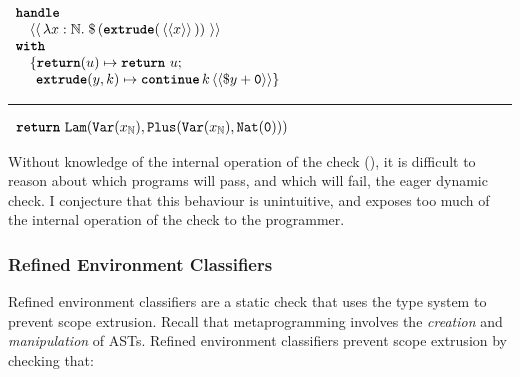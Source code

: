 \begin{code}
  \begin{efflst}
    $\begin{array}{l}
      \textbf{\texttt{handle}} \\
      \quad \equote[\, {\lambda x:\mathbb{N}.\; \splice[\, {(\textbf{\texttt{extrude}}(\, \equote[x] \, ))}\, ]} \, ] \\
      \textbf{\texttt{with}} \\
      \quad \{ \textbf{\texttt{return}}(u) \mapsto \return{u}; \\
      \quad \; \, \textbf{\texttt{extrude}}(y, k) \mapsto { {\continue{k}{\equote[{\splice[y]+\texttt{0}}]}}} \}\\
    \end{array}$

    \vspace{2mm} 
\textcolor{effComment}{\hrule height 0.2mm \relax}
\vspace{2mm} 

\textcolor{effComment}{$\begin{array}{l}\return{\Lam{\Var{x}{\mathbb{N}}}{\texttt{Plus}(\Var{x}{\mathbb{N}}, \texttt{Nat}(\texttt{0}))}}\end{array}$}

\end{efflst}
%
\label{listing:efflang-maybe-not-scope-extrusion}
\end{code}

Without knowledge of the internal operation of the check (), it is difficult to reason about which programs will pass, and which will fail, the eager dynamic check. I conjecture that this behaviour is unintuitive, and exposes too much of the internal operation of the check to the programmer. 

\subsubsection{Refined Environment Classifiers}\label{subsubsection:refined-environment-classifiers}
Refined environment classifiers are a static check that uses the type system to prevent scope extrusion. Recall that metaprogramming involves the \textit{creation} and \textit{manipulation} of ASTs. Refined environment classifiers prevent scope extrusion by checking that:

